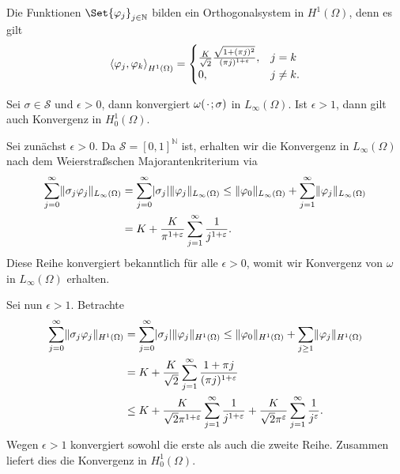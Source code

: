 \begin{Lemma}
    Die Funktionen $\Set{ \varphi_{j} }_{j \in \mathbb{N}}$ bilden ein Orthogonalsystem in $H^{1}(\Omega)$, denn es gilt
    \begin{equation}
        \left\langle\varphi_{j},\varphi_{k}\right\rangle_{H^{1}(\Omega)} = \begin{cases}
            \frac{K}{\sqrt 2 } \frac{\sqrt{1 + (\pi j)^{2}}}{(\pi j)^{1 + \varepsilon}},   &j = k \\
            0,          &j \neq k.
        \end{cases}
    \end{equation}
\end{Lemma}

\begin{Lemma}
    Sei $\sigma \in \mathcal S$ und $\epsilon > 0$, dann konvergiert $\omega({\mkern2mu\cdot\mkern2mu}; \sigma)$ in $L_{\infty}(\Omega)$.
    Ist $\epsilon > 1$, dann gilt auch Konvergenz in $H^{1}_{0}(\Omega)$.

    \begin{Beweis}
        Sei zunächst $\epsilon > 0$.
        Da $\mathcal S = [0, 1]^{\mathbb{N}}$ ist, erhalten wir die Konvergenz in $L_{\infty}(\Omega)$ nach dem Weierstraßschen Majorantenkriterium via
        \begin{align}
            \sum_{j = 0}^{\infty} \lVert\sigma_{j} \varphi_{j}\rVert_{L_{\infty}(\Omega)}
            &= \sum_{j = 0}^{\infty} \lvert\sigma_{j}\rvert \lVert\varphi_{j}\rVert_{L_{\infty}(\Omega)}
             \leq \lVert\varphi_{0}\rVert_{L_{\infty}(\Omega)} + \sum_{j = 1}^{\infty}  \lVert\varphi_{j}\rVert_{L_{\infty}(\Omega)}
            \\&= K + \frac{K}{\pi^{1+\varepsilon}} \sum_{j = 1}^{\infty} \frac{1}{j^{1+\varepsilon}}.
        \end{align}
        Diese Reihe konvergiert bekanntlich für alle $\epsilon > 0$, womit wir Konvergenz von $\omega$ in $L_{\infty}(\Omega)$ erhalten.

        Sei nun $\epsilon > 1$.
        Betrachte
        \begin{align}
            \sum_{j = 0}^{\infty} \lVert\sigma_{j} \varphi_{j}\rVert_{H^{1}(\Omega)}
            &= \sum_{j = 0}^{\infty} \lvert\sigma_{j}\rvert \lVert\varphi_{j}\rVert_{H^{1}(\Omega)}
            \leq  \lVert\varphi_{0}\rVert_{H^{1}(\Omega)} + \sum_{j \geq 1} \lVert\varphi_{j}\rVert_{H^{1}(\Omega)}
            \\&= K + \frac{K}{\sqrt{2}} \sum_{j = 1}^{\infty} \frac{1 + \pi j}{(\pi j)^{1+\varepsilon}}
            \\&\leq K + \frac{K}{\sqrt{2} \pi^{1 + \varepsilon}} \sum_{j = 1}^{\infty} \frac{1}{j^{1+\varepsilon}} + \frac{K}{\sqrt{2} \pi^{\varepsilon}} \sum_{j = 1}^{\infty} \frac{1}{j^{\varepsilon}}.
        \end{align}
        Wegen $\epsilon > 1$ konvergiert sowohl die erste als auch die zweite Reihe.
        Zusammen liefert dies die Konvergenz in $H^{1}_{0}(\Omega)$.
    \end{Beweis}
\end{Lemma}


